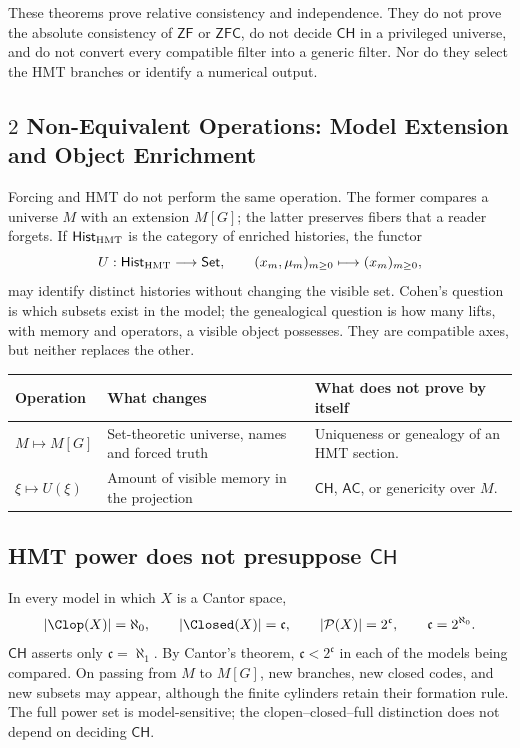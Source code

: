 \begin{remark}
These theorems prove relative consistency and independence. They do not prove the
absolute consistency of \(\mathsf{ZF}\) or \(\mathsf{ZFC}\), do not decide
\(\mathsf{CH}\) in a privileged universe, and do not convert every compatible filter
into a generic filter. Nor do they select the HMT branches or
identify a numerical output.
\end{remark}

\subsection{\(2\) Non-Equivalent Operations: Model Extension and Object Enrichment}

Forcing and HMT do not perform the same operation. The former compares a
universe \(M\) with an extension \(M[G]\); the latter preserves fibers that a
reader forgets. If \(\mathsf{Hist}_{\rm HMT}\) is the category of enriched
histories, the functor
\[
  U:\mathsf{Hist}_{\rm HMT}\longrightarrow\mathsf{Set},
  \qquad
  (x_m,\mu_m)_{m\ge0}\longmapsto(x_m)_{m\ge0},
\]
may identify distinct histories without changing the visible set. Cohen's
question is which subsets exist in the model; the genealogical question is
how many lifts, with memory and operators, a visible object possesses. They
are compatible axes, but neither replaces the other.

\begin{center}
\begin{tabularx}{.94\textwidth}{>{\bfseries}p{}XX}
\toprule
Operation & What changes & What does not prove by itself\\
\midrule
\(M\mapsto M[G]\) & Set-theoretic universe, names and forced truth &
Uniqueness or genealogy of an HMT section.\\
\(\xi\mapsto U(\xi)\) & Amount of visible memory in the projection &
\(\mathsf{CH}\), \(\mathsf{AC}\), or genericity over \(M\).\\
\bottomrule
\end{tabularx}
\end{center}

\subsection{HMT power does not presuppose \texorpdfstring{\(\mathsf{CH}\)}{CH}}

In every model in which \(X\) is a Cantor space,
\[
  |\Clop(X)|=\aleph_0,\qquad
  |\Closed(X)|=\mathfrak c,\qquad
  |\mathcal P(X)|=2^{\mathfrak c},
  \qquad \mathfrak c=2^{\aleph_0}.
\]
\(\mathsf{CH}\) asserts only \(\mathfrak c=\aleph_1\). By Cantor's theorem,
\(\mathfrak c<2^{\mathfrak c}\) in each of the models
being compared. On passing from \(M\) to \(M[G]\), new branches, new
closed codes, and new subsets may appear, although the finite cylinders
retain their formation rule. The full power set is model-sensitive; the
clopen--closed--full distinction does not depend on deciding \(\mathsf{CH}\).

